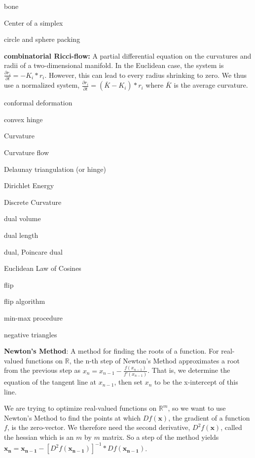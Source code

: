 \documentclass{article}
\begin{document}
bone

Center of a simplex

circle and sphere packing \newline

\hangindent=1.0cm \textbf{combinatorial Ricci-flow:} A partial differential equation on the curvatures and radii of a two-dimensional manifold. In the Euclidean case, the system is $\frac{\partial r_i }{\partial t} = -K_i * r_i$. However, this can lead to every radius shrinking to zero. We thus use a normalized system, $\frac{\partial r_i }{\partial t} = (\bar{K} - K_i) * r_i$ where $\bar{K}$ is the average curvature. \newline

conformal deformation

convex hinge

Curvature

Curvature flow

Delaunay triangulation (or hinge)

Dirichlet Energy

Discrete Curvature

dual volume

dual length

dual, Poincare dual

Euclidean Law of Cosines

flip

flip algorithm

min-max procedure

negative triangles

\hangindent=1.0cm \textbf{Newton's Method}: A method for finding the roots of a function. For real-valued functions on $\mathbb{R}$, the n-th step of Newton's Method approximates a root from the previous step as $x_n = x_{n-1} - \frac{f(x_{n-1})}{f'(x_{n-1})}$. That is, we determine the equation of the tangent line at $x_{n-1}$, then set $x_n$ to be the x-intercept of this line. \newline

 \hangindent=1.0cm \noindent We are trying to optimize real-valued functions on $\mathbb{R}^m$, so we want to use Newton's Method to find the points at which $Df(\mathbf{x})$, the gradient of a function $f$, is the zero-vector. We therefore need the second derivative, $D^2f(\mathbf{x})$, called the hessian which is an $m$ by $m$ matrix. So a step of the method yields $\mathbf{x_n} = \mathbf{x_{n-1}} - [D^2f(\mathbf{x_{n-1}})]^{-1} * Df(\mathbf{x_{n-1}})$. \newline
\end{document}
